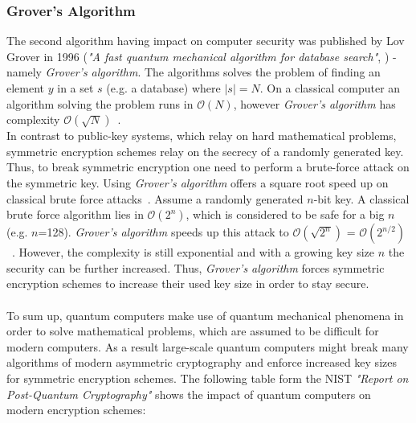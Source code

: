 \subsubsection{Grover's Algorithm}
The second algorithm having impact on computer security was published by Lov Grover in 1996 (\textit{"A fast quantum mechanical algorithm for database search"}, \parencite{grover1996fast}) - namely \textit{Grover's algorithm}. The algorithms solves the problem of finding an element $y$ in a set $s$ (e.g. a database) where $|s| = N$. On a classical computer an algorithm solving the problem runs in $\mathcal{O}(N)$, however \textit{Grover's algorithm} has complexity $\mathcal{O}(\sqrt{N})$~\parencite{nielsen2002quantum}.\\
In contrast to public-key systems, which relay on hard mathematical problems, symmetric encryption schemes relay on the secrecy of a randomly generated key. 
Thus, to break symmetric encryption one need to perform a brute-force attack on the symmetric key. Using \textit{Grover's algorithm} offers a square root speed up on classical brute force attacks~\parencite{mavroeidis2018impact}. Assume a randomly generated $n$-bit key. A classical brute force algorithm lies in $\mathcal{O}(2^n)$, which is considered to be safe for a big $n$ (e.g. $n$=128). \textit{Grover's algorithm} speeds up this attack to $\mathcal{O}(\sqrt{2^n})$ = $\mathcal{O}(2^{n/2})$~\parencite{mavroeidis2018impact}. However, the complexity is still exponential and with a growing key size $n$ the security can be further increased. Thus, \textit{Grover's algorithm} forces symmetric encryption schemes to increase their used key size in order to stay secure.
\\\\
To sum up, quantum computers make use of quantum mechanical phenomena in order to solve mathematical problems, which are assumed to be difficult for modern computers. As a result large-scale quantum computers might break many algorithms of modern asymmetric cryptography and enforce increased key sizes for symmetric encryption schemes. The following table form the NIST \textit{"Report on Post-Quantum Cryptography"} \parencite{chen2016report} shows the impact of quantum computers on modern encryption schemes:

